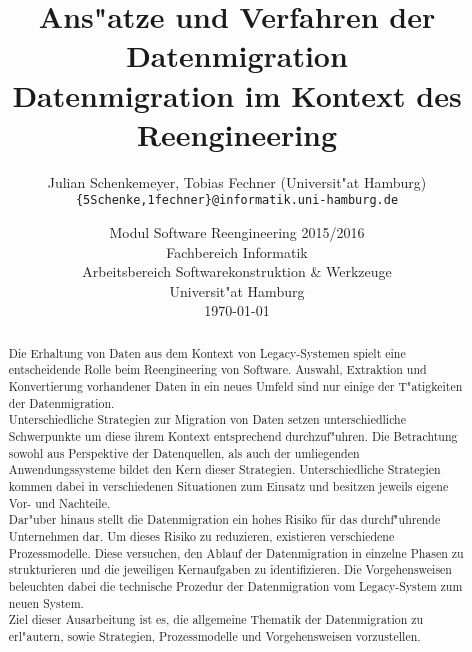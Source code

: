 \documentclass[conference]{IEEEtran}
\begin{document}
\clearpage
\thispagestyle{empty}
	
\title{Ans"atze und Verfahren der Datenmigration \\ \Large Datenmigration im Kontext des Reengineering}


\author{Julian Schenkemeyer, Tobias Fechner (Universit"at Hamburg)\\
	{\texttt{\{5Schenke,1fechner\}@informatik.uni-hamburg.de}}}

\date{Modul Software Reengineering 2015/2016\\
  \small Fachbereich Informatik\\ 
  Arbeitsbereich Softwarekonstruktion \& Werkzeuge\\ 
  Universit"at Hamburg\\[4mm]
  \today}

\maketitle

\begin{abstract}
Die Erhaltung von Daten aus dem Kontext von Legacy-Systemen spielt eine entscheidende Rolle beim Reengineering von Software. Auswahl, Extraktion und Konvertierung vorhandener Daten in ein neues Umfeld sind nur einige der T"atigkeiten der Datenmigration. \\
Unterschiedliche Strategien zur Migration von Daten setzen unterschiedliche Schwerpunkte um diese ihrem Kontext entsprechend durchzuf"uhren. Die Betrachtung sowohl aus Perspektive der Datenquellen, als auch der umliegenden Anwendungssysteme bildet den Kern dieser Strategien. Unterschiedliche Strategien kommen dabei in verschiedenen Situationen zum Einsatz und besitzen jeweils eigene Vor- und Nachteile. \\
Dar"uber hinaus stellt die Datenmigration ein hohes Risiko für das durchf"uhrende Unternehmen dar. Um dieses Risiko zu reduzieren, existieren verschiedene Prozessmodelle. Diese versuchen, den Ablauf der Datenmigration in einzelne Phasen zu strukturieren und die jeweiligen Kernaufgaben zu identifizieren. Die Vorgehensweisen beleuchten dabei die technische Prozedur der Datenmigration vom Legacy-System zum neuen System. \\
Ziel dieser Ausarbeitung ist es, die allgemeine Thematik der Datenmigration zu erl"autern, sowie Strategien, Prozessmodelle und Vorgehensweisen vorzustellen.
\end{abstract}
\end{document}

